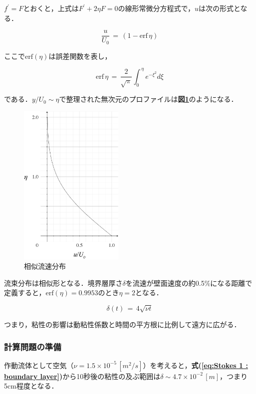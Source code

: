 $f^{\prime}=F$とおくと，上式は$F^{\prime}+2\eta F=0$の線形常微分方程式で，$u$は次の形式となる．

\begin{equation}
\frac{u}{U_0} \,=\, (1-\mathrm{erf}\, \eta)
\label{eq:Stokes 1 : solution}
\end{equation}

\noindent ここで$\mathrm{erf}(\eta)$は誤差関数を表し，

\begin{equation}
\mathrm{erf}\, \eta \,=\, \frac{2}{\sqrt{\pi}} \int_0^{\,\eta} {e^{-\xi^2}}d\xi
\label{eq:error function}
\end{equation}

\noindent である．$y\slash U_0 \sim \eta$で整理された無次元のプロファイルは\textbf{図\ref{fig:Rayleigh profile}}のようになる．

\begin{figure}[htdp]
\begin{center}
\includegraphics[width=5cm,clip]{exact.eps}
\end{center}
\caption{相似流速分布\cite{hino:74:fd}}
\label{fig:Rayleigh profile}
\end{figure}

流束分布は相似形となる．境界層厚さ$\delta$を流速が壁面速度の約0.5\%になる距離で定義すると，$\mathrm{erf}(\eta)=0.9953$のとき$\eta=2$となる．

\begin{equation}
\delta(t) \,=\, 4 \sqrt{\nu t}
\label{eq:Stokes 1 : boundary layer}
\end{equation}

つまり，粘性の影響は動粘性係数と時間の平方根に比例して遠方に広がる．

%
\subsubsection{計算問題の準備}
作動流体として空気（$\nu=1.5\times 10^{-5}\,[m^2/s]$）を考えると，\textbf{式(\ref{eq:Stokes 1 : boundary layer})}から10秒後の粘性の及ぶ範囲は$\delta \sim 4.7\times 10^{-2}\,[m]$，つまり5cm程度となる．


